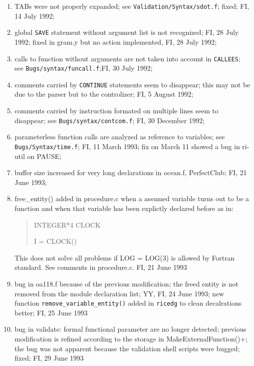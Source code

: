 \begin{enumerate}
  \item TABs were not properly expanded; see \verb+Validation/Syntax/sdot.f+;
	fixed; FI, 14 July 1992;

  \item global \verb+SAVE+ statement without argument list is not recognized;
	FI, 28 July 1992; fixed in gram.y but no action implemented, FI,
	28 July 1992;

  \item calls to function without arguments are not taken into account
	in \verb+CALLEES+; see \verb+Bugs/syntax/funcall.f+;FI, 30 July 1992;

  \item comments carried by \verb+CONTINUE+ statements seem to disappear;
	this may not be due to the parser but to the controlizer;
	FI, 5 August 1992;

  \item comments carried by instruction formated on multiple lines seem
	to disappear; see \verb+Bugs/syntax/contcom.f+; FI, 30 December 1992;

  \item parameterless function calls are analyzed as reference to
	variables; see \verb+Bugs/Syntax/time.f+; FI, 11 March 1993;
	fix on March 11 showed a bug in ri-util on PAUSE;

  \item buffer size increased for very long declarations in ocean.f,
	PerfectClub; FI, 21 June 1993;

  \item free_entity() added in procedure.c when a assumed variable turns
	out to be a function and when that variable has been explictly 
	declared before as in:
\begin{quote}
INTEGER*4 CLOCK

I = CLOCK()
\end{quote}
	This does not solve all problems if LOG = LOG(3) is allowed
	by Fortran standard. See comments in procedure.c.
	FI, 21 June 1993

  \item bug in oa118.f because of the previous modification; the freed
	entity is not removed from the module declaration list; YY, FI,
	24 June 1993; new function \verb+remove_variable_entity()+
	added in \verb+ricedg+ to clean decalrations better; FI, 25 June
	1993

  \item bug in validate: formal functional parameter are no longer
	detected; previous modification is refined according to the
	storage in MakeExternalFunction()+; the bug was not apparent
	because the validation shell scripts were bugged; fixed; FI, 29
	June 1993


\end{enumerate}
